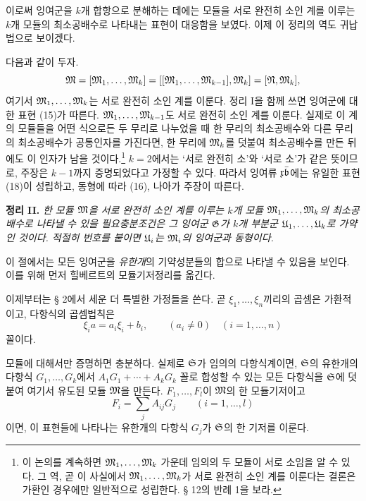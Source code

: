 이로써 잉여군을 \(k\)개 합항으로 분해하는 데에는 모듈을 서로 완전히 소인 계를 이루는 \(k\)개 모듈의 최소공배수로 나타내는 표현이 대응함을 보였다. 이제 이 정리의 역도 귀납법으로 보이겠다.

다음과 같이 두자.
\[
 \mathfrak M=[\mathfrak M_1,\ldots,\mathfrak M_k]
     =[[\mathfrak M_1,\ldots,\mathfrak M_{k-1}],\mathfrak M_k]
     =[\mathfrak N,\mathfrak M_k],
\]
여기서 \(\mathfrak M_1,\ldots,\mathfrak M_k\)는 서로 완전히 소인 계를 이룬다. 정리 I을 함께 쓰면 잉여군에 대한 표현 (15)가 따른다. \(\mathfrak M_1,\ldots,\mathfrak M_{k-1}\)도 서로 완전히 소인 계를 이룬다. 실제로 이 계의 모듈들을 어떤 식으로든 두 무리로 나누었을 때 한 무리의 최소공배수와 다른 무리의 최소공배수가 공통인자를 가진다면, 한 무리에 \(\mathfrak M_k\)를 덧붙여 최소공배수를 만든 뒤에도 이 인자가 남을 것이다.\footnote{이 논의를 계속하면 \(\mathfrak M_1,\ldots,\mathfrak M_k\) 가운데 임의의 두 모듈이 서로 소임을 알 수 있다. 그 역, 곧 이 사실에서 \(\mathfrak M_1,\ldots,\mathfrak M_k\)가 서로 완전히 소인 계를 이룬다는 결론은 가환인 경우에만 일반적으로 성립한다. § 12의 반례 1을 보라.} \(k=2\)에서는 ‘서로 완전히 소’와 ‘서로 소’가 같은 뜻이므로, 주장은 \(k-1\)까지 증명되었다고 가정할 수 있다. 따라서 잉여류 \(\mathfrak x\bar{\mathfrak{b}}\)에는 유일한 표현 (18)이 성립하고, 동형에 따라 (16), 나아가 주장이 따른다.

\textbf{정리 II.} \emph{한 모듈 \(\mathfrak M\)을 서로 완전히 소인 계를 이루는 \(k\)개 모듈 \(\mathfrak M_1,\ldots,\mathfrak M_k\)의 최소공배수로 나타낼 수 있을 필요충분조건은 그 잉여군 \(\mathfrak G\)가 \(k\)개 부분군 \(\mathfrak U_1,\ldots,\mathfrak U_k\)로 가약인 것이다. 적절히 번호를 붙이면 \(\mathfrak U_i\)는 \(\mathfrak M_i\)의 잉여군과 동형이다.}


이 절에서는 모든 잉여군을 \emph{유한개}의 기약성분들의 합으로 나타낼 수 있음을 보인다. 이를 위해 먼저 힐베르트의 모듈기저정리를 옮긴다.

이제부터는 § 2에서 세운 더 특별한 가정들을 쓴다. 곧 \(\xi_1,\ldots,\xi_n\)끼리의 곱셈은 가환적이고, 다항식의 곱셈법칙은
\begin{equation}
 \xi_i a=a_i\xi_i+b_i,\qquad
 (a_i\ne0)\quad(i=1,\ldots,n)
\tag{6}
\end{equation}
꼴이다.

모듈에 대해서만 증명하면 충분하다. 실제로 \(\mathfrak S\)가 임의의 다항식계이면, \(\mathfrak S\)의 유한개의 다항식 \(G_1,\ldots,G_k\)에서 \(A_1G_1+\cdots+A_kG_k\) 꼴로 합성할 수 있는 모든 다항식을 \(\mathfrak S\)에 덧붙여 여기서 유도된 모듈 \(\mathfrak M\)을 만든다. \(F_1,\ldots,F_l\)이 \(\mathfrak M\)의 한 모듈기저이고
\[
 F_i=\sum_j A_{ij}G_j\qquad(i=1,\ldots,l)
\]
이면, 이 표현들에 나타나는 유한개의 다항식 \(G_j\)가 \(\mathfrak S\)의 한 기저를 이룬다.

